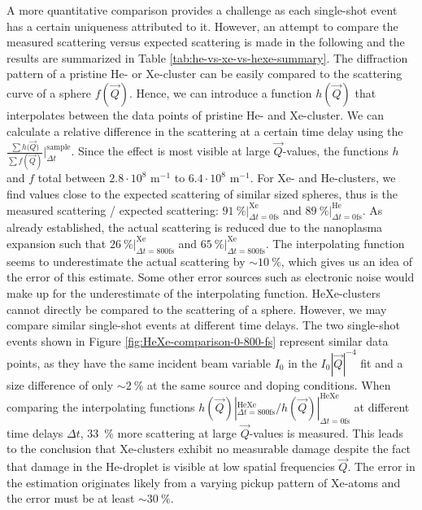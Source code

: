 A more quantitative comparison provides a challenge as each single-shot event has a certain uniqueness attributed to it. However, an attempt to compare the measured scattering versus expected scattering is made in the following and the results are summarized in Table \ref{tab:he-vs-xe-vs-hexe-summary}. The diffraction pattern of a pristine He- or Xe-cluster can be easily compared to the scattering curve of a sphere $f(\vec{Q})$. Hence, we can introduce a function $h(\vec{Q})$ that interpolates between the data points of pristine He- and Xe-cluster. We can calculate a relative difference in the scattering at a certain time delay using the $\tfrac{\sum{h(\vec{Q}})}{\sum{f(\vec{Q})}}|_{\Delta t}^{\text{sample}}$. Since the effect is most visible at large $\vec{Q}$-values, the functions $h$ and $f$ total between $2.8\cdot 10^{8}$ m$^{-1}$ to $6.4\cdot 10^{8}$ m$^{-1}$. For Xe- and He-clusters, we find values close to the expected scattering of similar sized spheres, thus is the measured scattering / expected scattering: $\SI{91}{\percent} |_{\Delta t = 0 \text{fs}}^{\text{Xe}}$ and $\SI{89}{\percent}|_{\Delta t=0 \text{fs}}^{\text{He}}$. As already established, the actual scattering is reduced due to the nanoplasma expansion such that $\SI{26}{\percent} |_{\Delta t = 800 \text{fs}}^{\text{Xe}}$ and $\SI{65}{\percent} |_{\Delta t = 800 \text{fs}}^{\text{Xe}}$. The interpolating function seems to underestimate the actual scattering by $\sim \SI{10}{\percent}$, which gives us an idea of the error of this estimate. Some other error sources such as electronic noise would make up for the underestimate of the interpolating function. HeXe-clusters cannot directly be compared to the scattering of a sphere. However, we may compare similar single-shot events at different time delays. The two single-shot events shown in Figure \ref{fig:HeXe-comparison-0-800-fs} represent similar data points, as they have the same incident beam variable $I_{0}$ in the $I_{0} \left|\vec{Q}\right|^{-4}$ fit and a size difference of only $\sim \SI{2}{\percent}$ at the same source and doping conditions. When comparing the interpolating functions $h(\vec{Q}) |_{\Delta t = 800 \text{fs}}^{\text{HeXe}}/h(\vec{Q}) |_{\Delta t = 0 \text{fs}}^{\text{HeXe}}$ at different time delays $\Delta t$, \SI{33}{\percent} more scattering at large $\vec{Q}$-values is measured. This leads to the conclusion that Xe-clusters exhibit no measurable damage despite the fact that damage in the He-droplet is visible at low spatial frequencies $\vec{Q}$. The error in the estimation originates likely from a varying pickup pattern of Xe-atoms and the error must be at least $\sim \SI{30}{\percent}$.\\[1\baselineskip]
